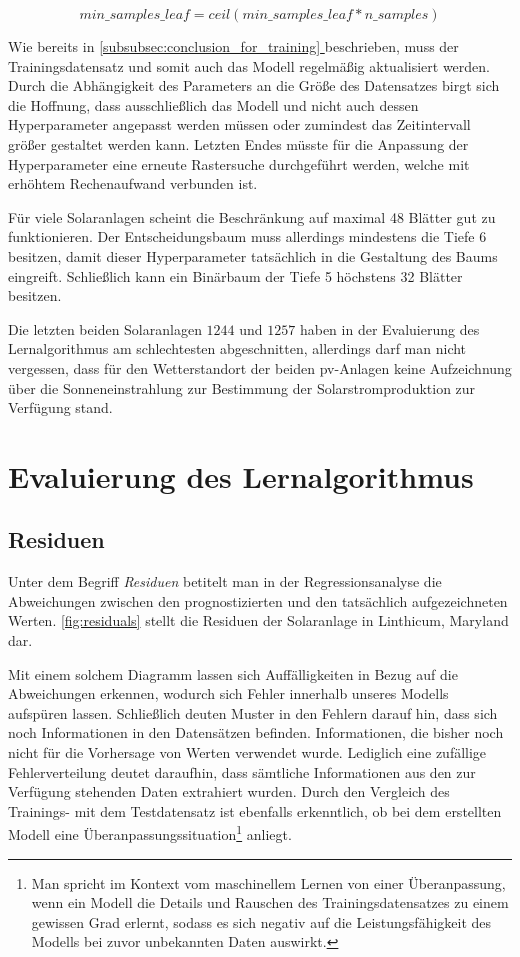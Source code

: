 \documentclass[12pt, a4paper]{article}
\newcommand*{\fullref}[1]{\hyperref[{#1}]{\autoref*{#1} \nameref*{#1}}}
\begin{document}
\begin{equation}
\label{eqn:min_samples_leaf}
min\_samples\_leaf=ceil(min\_samples\_leaf*n\_samples)
\end{equation}

Wie bereits in \fullref{subsubsec:conclusion_for_training} beschrieben, muss der Trainingsdatensatz und somit auch das Modell regelmäßig aktualisiert werden. Durch die Abhängigkeit des Parameters an die Größe des Datensatzes birgt sich die Hoffnung, dass ausschließlich das Modell und nicht auch dessen Hyperparameter angepasst werden müssen oder zumindest das Zeitintervall größer gestaltet werden kann. Letzten Endes müsste für die Anpassung der Hyperparameter eine erneute Rastersuche durchgeführt werden, welche mit erhöhtem Rechenaufwand verbunden ist.

Für viele Solaranlagen scheint die Beschränkung auf maximal 48 Blätter gut zu funktionieren. Der Entscheidungsbaum muss allerdings mindestens die Tiefe 6 besitzen, damit dieser Hyperparameter tatsächlich in die Gestaltung des Baums eingreift. Schließlich kann ein Binärbaum der Tiefe 5 höchstens 32 Blätter besitzen.

Die letzten beiden Solaranlagen $1244$ und $1257$ haben in der Evaluierung des Lernalgorithmus am schlechtesten abgeschnitten, allerdings darf man nicht vergessen, dass für den Wetterstandort der beiden \ac{pv}-Anlagen keine Aufzeichnung über die Sonneneinstrahlung zur Bestimmung der Solarstromproduktion zur Verfügung stand.
\newpage

\section{Evaluierung des Lernalgorithmus}
\label{sec:evaluation}

\subsection{Residuen}

Unter dem Begriff \textit{Residuen} betitelt man in der Regressionsanalyse die Abweichungen zwischen den prognostizierten und den tatsächlich aufgezeichneten Werten. \autoref{fig:residuals} stellt die Residuen der Solaranlage in Linthicum, Maryland dar. 

Mit einem solchem Diagramm lassen sich Auffälligkeiten in Bezug auf die Abweichungen erkennen, wodurch sich Fehler innerhalb unseres Modells aufspüren lassen. Schließlich deuten Muster in den Fehlern darauf hin, dass sich noch Informationen in den Datensätzen befinden. Informationen, die bisher noch nicht für die Vorhersage von Werten verwendet wurde. Lediglich eine zufällige Fehlerverteilung deutet daraufhin, dass sämtliche Informationen aus den zur Verfügung stehenden Daten extrahiert wurden. Durch den Vergleich des Trainings- mit dem Testdatensatz ist ebenfalls erkenntlich, ob bei dem erstellten Modell eine Überanpassungssituation\footnote{Man spricht im Kontext vom maschinellem Lernen von einer Überanpassung, wenn ein Modell die Details und Rauschen des Trainingsdatensatzes zu einem gewissen Grad erlernt, sodass es sich negativ auf die Leistungsfähigkeit des Modells bei zuvor unbekannten Daten auswirkt.} anliegt.
\end{document}
